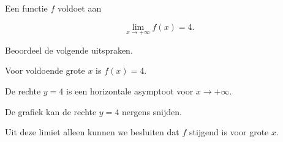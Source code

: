\documentclass{ximera}
\begin{document}

\begin{oefening}{\oefU\ESS}

Een functie $f$ voldoet aan

\[
\lim_{x\to+\infty}f(x)=4.
\]

Beoordeel de volgende uitspraken.

\begin{question}
Voor voldoende grote $x$ is $f(x)=4$.

\begin{multipleChoice}
\end{multipleChoice}
\end{question}

\begin{question}
De rechte $y=4$ is een horizontale asymptoot voor
$x\to+\infty$.

\begin{multipleChoice}
\end{multipleChoice}
\end{question}

\begin{question}
De grafiek kan de rechte $y=4$ nergens snijden.

\begin{multipleChoice}
\end{multipleChoice}
\end{question}

\begin{question}
Uit deze limiet alleen kunnen we besluiten dat $f$ stijgend is voor
grote $x$.

\begin{multipleChoice}
\end{multipleChoice}
\end{question}

\end{oefening}



\end{document}
